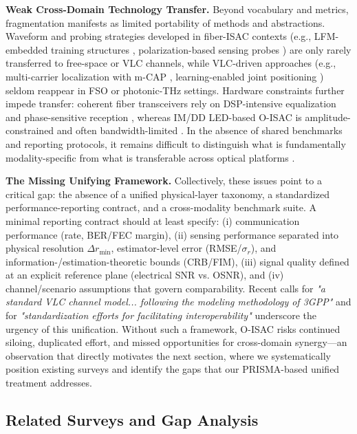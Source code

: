 \documentclass[lettersize,journal]{IEEEtran}
\begin{document}
\textbf{Weak Cross-Domain Technology Transfer.} Beyond vocabulary and metrics, fragmentation manifests as limited portability of methods and abstractions. Waveform and probing strategies developed in fiber-ISAC contexts (e.g., LFM-embedded training structures \cite{O_ISAC_042}, polarization-based sensing probes \cite{O_ISAC_074}) are only rarely transferred to free-space or VLC channels, while VLC-driven approaches (e.g., multi-carrier localization with m-CAP \cite{O_ISAC_022}, learning-enabled joint positioning \cite{O_ISAC_039}) seldom reappear in FSO or photonic-THz settings. Hardware constraints further impede transfer: coherent fiber transceivers rely on DSP-intensive equalization and phase-sensitive reception \cite{O_ISAC_033}, whereas IM/DD LED-based O-ISAC is amplitude-constrained and often bandwidth-limited \cite{O_ISAC_054}. In the absence of shared benchmarks and reporting protocols, it remains difficult to distinguish what is fundamentally modality-specific from what is transferable across optical platforms \cite{O_ISAC_068,O_ISAC_067}.

\textbf{The Missing Unifying Framework.} Collectively, these issues point to a critical gap: the absence of a unified physical-layer taxonomy, a standardized performance-reporting contract, and a cross-modality benchmark suite. A minimal reporting contract should at least specify: (i) communication performance (rate, BER/FEC margin), (ii) sensing performance separated into physical resolution $\Delta r_{\min}$, estimator-level error (RMSE/$\sigma_r$), and information-/estimation-theoretic bounds (CRB/FIM), (iii) signal quality defined at an explicit reference plane (electrical SNR vs. OSNR), and (iv) channel/scenario assumptions that govern comparability. Recent calls for \textit{"a standard VLC channel model... following the modeling methodology of 3GPP"} \cite{O_ISAC_327} and for \textit{"standardization efforts for facilitating interoperability"} \cite{O_ISAC_068,O_ISAC_082} underscore the urgency of this unification. Without such a framework, O-ISAC risks continued siloing, duplicated effort, and missed opportunities for cross-domain synergy---an observation that directly motivates the next section, where we systematically position existing surveys and identify the gaps that our PRISMA-based unified treatment addresses.

\subsection{Related Surveys and Gap Analysis}
\end{document}
